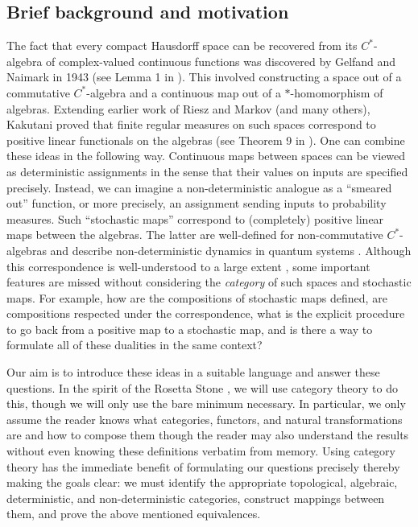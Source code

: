 \documentclass[12pt]{article}
\theoremstyle{theorem}
\theoremstyle{definition}
\numberwithin{equation}{section}
\newcommand{\<}{\langle}
\renewcommand{\>}{\rangle}
\begin{document}
\subsection{Brief background and motivation}

The fact that every compact Hausdorff space can be recovered from its
$C^*$-algebra of complex-valued continuous functions was discovered
by Gelfand and Naimark in 1943 (see Lemma 1 in \cite{GN43}). 
This involved constructing a space out of a commutative $C^*$-algebra and a
continuous map out of a $*$-homomorphism of algebras.
Extending earlier work of Riesz and Markov (and many others), 
Kakutani proved that finite regular measures on such spaces
correspond to positive linear functionals on the algebras
(see Theorem 9 in \cite{Ka41}). 
One can combine these ideas in the following way. 
Continuous maps between spaces can be viewed as deterministic
assignments in the sense that their values on inputs are specified precisely.
Instead, we can imagine a non-deterministic
analogue as a ``smeared out'' function, or more precisely, 
an assignment sending inputs to probability measures. 
Such ``stochastic maps'' correspond to (completely) positive linear
maps between the algebras. 
The latter are well-defined for non-commutative $C^*$-algebras and 
describe non-deterministic dynamics in quantum systems \cite{Li76}. 
Although this correspondence is 
well-understood to a large extent \cite{Ci06}, \cite{EFHN15} 
some important features are missed
without considering the \emph{category} of such spaces and stochastic maps. 
For example, how are the compositions of stochastic maps defined, 
are compositions respected under the correspondence, 
what is the explicit procedure to go back from a positive map to a stochastic 
map, and is there a way to formulate all of these dualities in the same context? 

Our aim is to introduce these ideas in a suitable language
and answer these questions. In the spirit
of the Rosetta Stone \cite{BaSt11}, we will use category theory to do this, 
though we will only use the bare minimum necessary. 
In particular, we only assume the reader knows what 
categories, functors, and natural transformations are and how to 
compose them though the reader may also understand the results
without even knowing these definitions verbatim from memory. 
Using category theory has the
immediate benefit of formulating our questions precisely thereby 
making the goals clear: we must identify the appropriate 
topological, algebraic, deterministic, and non-deterministic categories, construct
mappings between them, and prove the above mentioned equivalences.
\end{document}
